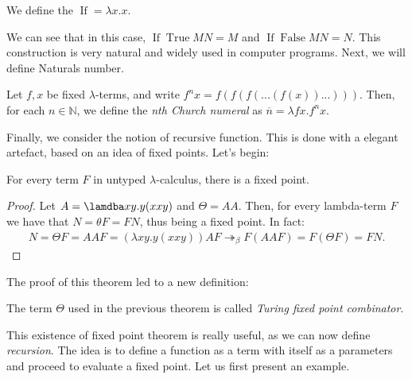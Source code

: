 \begin{definition}
  We define the $\operatorname{If} = \lambda x.x$.  
\end{definition}

We can see that in this case, $\operatorname{If} \operatorname{True} M N = M$ and $\operatorname{If} \operatorname{False} M N = N$. This construction is very natural and widely used in computer programs. Next, we will define Naturals number. 

\begin{definition} \label{def:untyped-natural} 
  Let $f,x$ be fixed $\lambda$-terms, and write $f^nx = f(f(f(...(f(x))...)))$. Then, for each $n \in \mathbb N$, we define the \emph{nth Church numeral} as $\overline n=\lambda fx.f^nx$.
\end{definition}

Finally, we consider the notion of recursive function. This is done with a elegant artefact, based on an idea of fixed points. Let's begin:



\begin{theorem}
  For every term $F$ in untyped $\lambda$-calculus, there is a fixed point.
\end{theorem}
\begin{proof}
  Let $A=\lamdba xy.y(xxy)$ and $\Theta =AA$. Then, for every lambda-term $F$ we have that $N=\theta F = FN$, thus being a fixed point. In fact:
  \begin{align*}
    N = \Theta F = AAF = (\lambda xy.y(xxy))AF \twoheadrightarrow_\beta F(AAF) = F(\Theta F) = FN.
  \end{align*}
\end{proof}
The proof of this theorem led to a new definition:

\begin{definition}
  The term $\Theta$ used in the previous theorem is called \emph{Turing fixed point combinator}.
\end{definition}

This existence of fixed point theorem is really useful, as we can now define \emph{recursion}. The idea is to define a function as a term with itself as a parameters and proceed to evaluate a fixed point. Let us first present an example.

